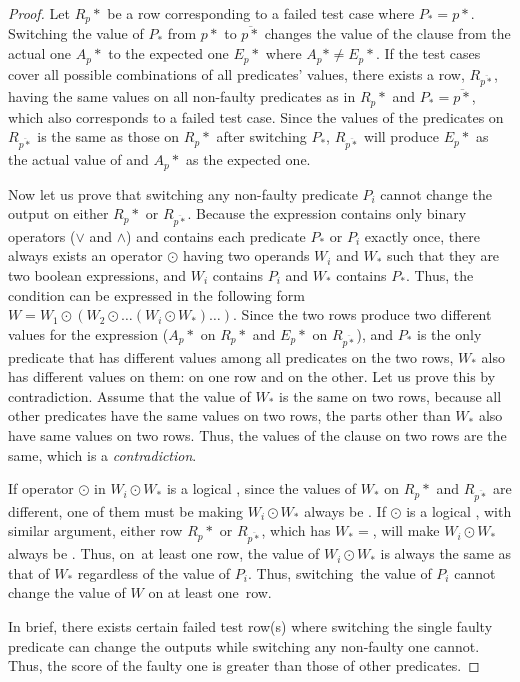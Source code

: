\begin{proof}
Let $R_p*$ be a row corresponding to a failed test case where
$P_*=p*$.  Switching the value of $P_*$ from $p*$ to $\overline{p*}$
changes the value of the  clause from the actual one
$A_p*$ to the expected one $E_p*$ where $A_p* \neq E_p*$. If the test
cases cover all possible combinations of all predicates' values, there
exists a row, $R_{\overline{p*}}$, having the same values on all
non-faulty predicates as in $R_p*$ and $P_*=\overline{p*}$, which also
corresponds to a failed test case. Since the values of the predicates
on $R_{\overline{p*}}$ is the same as those on $R_p*$ after switching
$P_*$, $R_{\overline{p*}}$ will produce $E_p*$ as the actual value of
 and $A_p*$ as the expected one. 

Now let us prove that switching any non-faulty predicate $P_i$ cannot
change the output on either $R_p*$ or $R_{\overline{p*}}$. Because the
 expression contains only binary operators ($\vee$ and
$\wedge$) and contains each predicate $P_*$ or $P_i$ exactly once,
there always exists an operator $\odot$ having two operands $W_i$ and
$W_*$ such that they are two boolean expressions, and $W_i$ contains
$P_i$ and $W_*$ contains $P_*$.  Thus, the
 condition can be expressed in the following form
$W = W_1 \odot (W_2 \odot \dots (W_i \odot W_*)\dots)$.  Since the two
rows produce two different values for the  expression
($A_p*$ on $R_p*$ and $E_p*$ on $R_{\overline{p*}}$), and $P_*$ is the
only predicate that has different values among all predicates on the
two rows, $W_*$ also has different values on them:  on one
row and  on the other. Let us prove this by
contradiction. Assume that the value of $W_*$ is the same on two rows,
because all other predicates have the same values on two rows, the
parts other than $W_*$ also have same values on two rows. Thus, the
values of the  clause on two rows are the same, which is
a {\em contradiction}.

If operator $\odot$ in $W_i \odot W_*$ is a logical , since the
values of $W_*$ on $R_p*$ and $R_{\overline{p*}}$ are different, one
of them must be  making $W_i \odot W_*$ always be
. If $\odot$ is a logical , with similar argument, either
row $R_p*$ or $R_{\overline{p*}}$, which has $W_*=$, will
make $W_i \odot W_*$ always be . Thus, on~at least
one row, the value of $W_i \odot W_*$ is always the same as that of
$W_*$ regardless of the value of $P_i$. Thus, switching~the value of
$P_i$ cannot change the value of $W$ on at least one~row.

In brief, there exists certain failed test row(s) where switching
the single faulty predicate can change the outputs while switching any
non-faulty one cannot. Thus, the  score of the
faulty one is greater than those of other predicates.
\end{proof}

